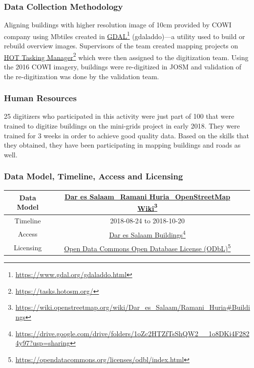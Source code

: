 \documentclass[a4paper,12pt,twoside]{article}
\begin{document}
\subsubsection{Data Collection Methodology}

Aligning buildings with higher resolution image of 10cm provided by COWI company using Mbtiles created in \href{https://www.gdal.org/gdaladdo.html}{GDAL}\footnote{\url{https://www.gdal.org/gdaladdo.html}} (gdaladdo)---a utility used to build or rebuild overview images. Supervisors of the team created mapping projects on \href{https://tasks.hotosm.org/}{HOT Tasking Manager}\footnote{\url{https://tasks.hotosm.org/}} which were then assigned to the digitization team. Using the 2016 COWI imagery, buildings were re-digitized in JOSM and validation of the re-digitization was done by the validation team.

\subsubsection{Human Resources}
25 digitizers who participated in this activity were just part of 100 that were trained to digitize buildings on the mini-grids project in early 2018.  They were trained for 3 weeks in order to achieve good quality data. Based on the skills that they obtained, they have been participating in mapping buildings and roads as well.

\subsubsection{Data Model, Timeline, Access and Licensing}
\begin{center}
\begin{tabular}{|c|c|c|}  
 \hline
Data Model &
        \href{https://wiki.openstreetmap.org/wiki/Dar_es_Salaam/Ramani_Huria\#Buildings}{Dar es Salaam\_Ramani Huria\_OpenStreetMap Wiki}\footnote{\url{https://wiki.openstreetmap.org/wiki/Dar_es_Salaam/Ramani_Huria\#Buildings}} \\
 \hline
  Timeline  &  2018-08-24 to 2018-10-20 \\
\hline  
 Access  & 
    \href{https://drive.google.com/drive/folders/1oZc2HTZfTsShQW2__1o8DKi4F2824y97?usp=sharing}{Dar es Salaam Buildings}\footnote{\url{https://drive.google.com/drive/folders/1oZc2HTZfTsShQW2__1o8DKi4F2824y97?usp=sharing}} \\
   
\hline 
    Licensing & \href{https://opendatacommons.org/licenses/odbl/index.html}{Open Data Commons Open Database License (ODbL)}\footnote{\url{https://opendatacommons.org/licenses/odbl/index.html}} \\
\hline
\end{tabular}
\end{center}
\end{document}
